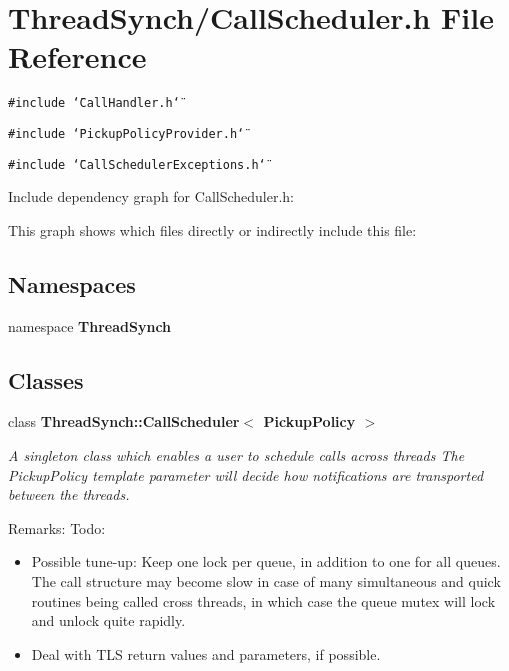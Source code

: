 \section{Thread\-Synch/Call\-Scheduler.h File Reference}
\label{_call_scheduler_8h}
{\tt \#include \char`\"{}Call\-Handler.h\char`\"{}}\par
{\tt \#include \char`\"{}Pickup\-Policy\-Provider.h\char`\"{}}\par
{\tt \#include \char`\"{}Call\-Scheduler\-Exceptions.h\char`\"{}}\par


Include dependency graph for Call\-Scheduler.h:

This graph shows which files directly or indirectly include this file:\subsection*{Namespaces}
\begin{CompactItemize}
\item 
namespace {\bf Thread\-Synch}
\end{CompactItemize}
\subsection*{Classes}
\begin{CompactItemize}
\item 
class {\bf Thread\-Synch::Call\-Scheduler$<$ Pickup\-Policy $>$}
\begin{CompactList}\small\item\em A singleton class which enables a user to schedule calls across threads The Pickup\-Policy template parameter will decide how notifications are transported between the threads. \begin{Desc}
\item[Remarks:]Todo:\begin{itemize}
\item Possible tune-up: Keep one lock per queue, in addition to one for all queues. The call structure may become slow in case of many simultaneous and quick routines being called cross threads, in which case the queue mutex will lock and unlock quite rapidly.\end{itemize}
\end{Desc}
\begin{itemize}
\item Deal with TLS return values and parameters, if possible. \end{itemize}
\item\end{CompactList}\end{CompactItemize}
